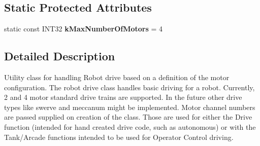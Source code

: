 \subsection*{Static Protected Attributes}
\begin{DoxyCompactItemize}
\item 
\hypertarget{classRobotDrive_a7c33f1e29f943ef3d8a81b2550f2bc7b}{
static const INT32 {\bfseries kMaxNumberOfMotors} = 4}
\label{classRobotDrive_a7c33f1e29f943ef3d8a81b2550f2bc7b}

\end{DoxyCompactItemize}


\subsection{Detailed Description}
Utility class for handling Robot drive based on a definition of the motor configuration. The robot drive class handles basic driving for a robot. Currently, 2 and 4 motor standard drive trains are supported. In the future other drive types like swerve and meccanum might be implemented. Motor channel numbers are passed supplied on creation of the class. Those are used for either the Drive function (intended for hand created drive code, such as autonomous) or with the Tank/Arcade functions intended to be used for Operator Control driving. 

